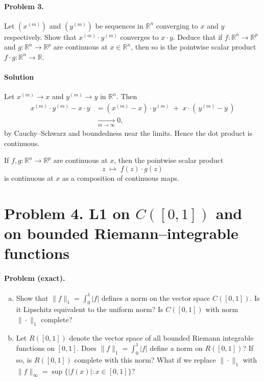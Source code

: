 \documentclass[12pt,a4paper]{article}
\theoremstyle{plain}
\theoremstyle{definition}
\theoremstyle{remark}
\theoremstyle{remark}
\begin{document}
\paragraph{Problem 3.}

Let $(x^{(m)})$ and $(y^{(m)})$ be sequences in $\mathbb{R}^n$ converging to $x$ and $y$ respectively.
Show that $x^{(m)}\cdot y^{(m)}$ converges to $x\cdot y$. Deduce that if
$f:\mathbb{R}^n\to\mathbb{R}^p$ and $g:\mathbb{R}^n\to\mathbb{R}^p$ are continuous at
$x\in\mathbb{R}^n$, then so is the pointwise scalar product
$f\cdot g:\mathbb{R}^n\to\mathbb{R}$.

\paragraph{Solution}

Let $x^{(m)}\to x$ and $y^{(m)}\to y$ in $\mathbb{R}^n$. Then
\begin{align*}
	x^{(m)}\!\cdot y^{(m)} - x\!\cdot y
	&= (x^{(m)}-x)\!\cdot y^{(m)} \;+\; x\!\cdot (\,y^{(m)}-y\,) \\
	&\xrightarrow[m\to\infty]{} 0,
\end{align*}
by Cauchy--Schwarz and boundedness near the limits. Hence the dot product is continuous.

If $f,g:\mathbb{R}^n\to\mathbb{R}^p$ are continuous at $x$, then the pointwise scalar product
\[
z \;\longmapsto\; f(z)\cdot g(z)
\]
is continuous at $x$ as a composition of continuous maps.
	


\section*{Problem 4. {L1} on $C([0,1])$ and on bounded Riemann–integrable functions}

\paragraph{Problem (exact).}
\begin{enumerate}[(a)]
	\item Show that $\|f\|_{1}=\int_{0}^{1}|f|$ defines a norm on the vector space $C([0,1])$.
	Is it Lipschitz equivalent to the uniform norm? Is $C([0,1])$ with norm $\|\cdot\|_{1}$ complete?
	
	\item Let $R([0,1])$ denote the vector space of all bounded Riemann integrable functions on $[0,1]$.
	Does $\|f\|_{1}=\int_{0}^{1}|f|$ define a norm on $R([0,1])$? If so, is $R([0,1])$ complete with this norm?
	What if we replace $\|\cdot\|_{1}$ with $\|f\|_{\infty}=\sup\{|f(x)|:x\in[0,1]\}$?
\end{enumerate}
\end{document}
